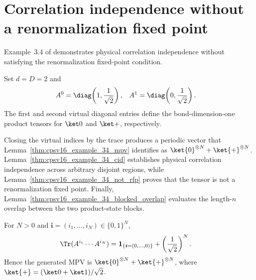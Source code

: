 \section{Correlation independence without a renormalization fixed point}
\label{sec:cpsv16_example_34}

Example~3.4 of \cite{Cirac2016MPDO_arXiv,Cirac2017MPDO_AnnPhys} demonstrates
physical correlation independence without satisfying the renormalization
fixed-point condition.

\begin{definition}
    \label{def:cpsv16_example_34_tensor}
    \leanok
    Set $d=D=2$ and
    \begin{align}
        A^0 & =\diag\!\left(1,\frac{1}{\sqrt2}\right),
            &
        A^1 & =\diag\!\left(0,\frac{1}{\sqrt2}\right).
        \notag
    \end{align}
    The first and second virtual diagonal entries define the bond-dimension-one
    product tensors for $\ket0$ and $\ket+$, respectively.
\end{definition}

Closing the virtual indices by the trace produces a periodic vector that
Lemma~\ref{thm:cpsv16_example_34_mpv} identifies as
$\ket{0}^{\otimes N}+\ket{+}^{\otimes N}$.
Lemma~\ref{thm:cpsv16_example_34_cid} establishes physical correlation
independence across arbitrary disjoint regions, while
Lemma~\ref{thm:cpsv16_example_34_not_rfp} proves that the tensor is not
a renormalization fixed point. Finally,
Lemma~\ref{thm:cpsv16_example_34_blocked_overlap} evaluates the length-$n$
overlap between the two product-state blocks.


\begin{lemma}
    \label{thm:cpsv16_example_34_mpv}
    \leanok
    For $N>0$ and $\boldsymbol i=(i_1,\ldots,i_N)\in\{0,1\}^N$,
    \begin{align}
        \Tr(A^{i_1}\cdots A^{i_N})
         & =\mathbf 1_{\{\boldsymbol i=(0,\ldots,0)\}}
        +\left(\frac{1}{\sqrt2}\right)^N.
        \notag
    \end{align}
    Hence the generated MPV is
    $\ket{0}^{\otimes N}+\ket{+}^{\otimes N}$, where
    $\ket{+}=(\ket0+\ket1)/\sqrt2$.
\end{lemma}

